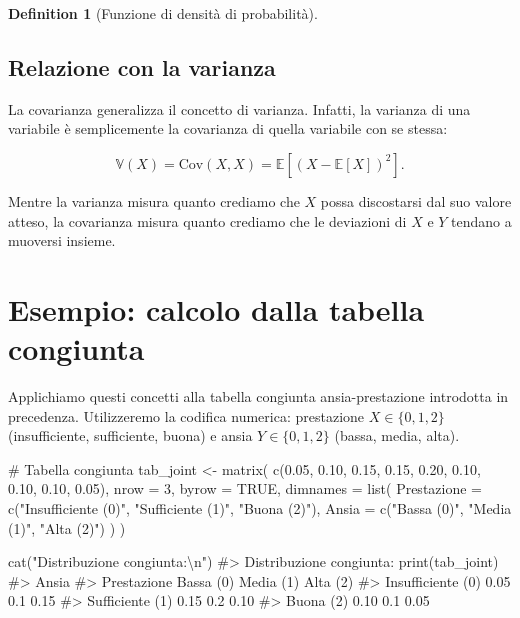 \documentclass[
  letterpaper,
  DIV=11,
  numbers=noendperiod,
  oneside]{scrreprt}
\newenvironment{Shaded}{\begin{snugshade}}{\end{snugshade}}
\newcommand{\AttributeTok}[1]{\textcolor[rgb]{0.40,0.45,0.13}{#1}}
\newcommand{\CommentTok}[1]{\textcolor[rgb]{0.37,0.37,0.37}{#1}}
\newcommand{\ConstantTok}[1]{\textcolor[rgb]{0.56,0.35,0.01}{#1}}
\newcommand{\DecValTok}[1]{\textcolor[rgb]{0.68,0.00,0.00}{#1}}
\newcommand{\FloatTok}[1]{\textcolor[rgb]{0.68,0.00,0.00}{#1}}
\newcommand{\FunctionTok}[1]{\textcolor[rgb]{0.28,0.35,0.67}{#1}}
\newcommand{\NormalTok}[1]{\textcolor[rgb]{0.00,0.23,0.31}{#1}}
\newcommand{\OtherTok}[1]{\textcolor[rgb]{0.00,0.23,0.31}{#1}}
\newcommand{\SpecialCharTok}[1]{\textcolor[rgb]{0.37,0.37,0.37}{#1}}
\newcommand{\StringTok}[1]{\textcolor[rgb]{0.13,0.47,0.30}{#1}}
\theoremstyle{definition}
\theoremstyle{plain}
\theoremstyle{definition}
\newtheorem{definition}{Definition}[chapter]
\theoremstyle{remark}
\begin{document}
\begin{definition}[Funzione di densità di
probabilità]
\subsection{Relazione con la varianza}\label{relazione-con-la-varianza}

La covarianza generalizza il concetto di varianza. Infatti, la varianza
di una variabile è semplicemente la covarianza di quella variabile con
se stessa:

\[
\mathbb{V}(X) = \text{Cov}(X, X) = \mathbb{E}[(X - \mathbb{E}[X])^2].
\]

Mentre la varianza misura quanto crediamo che \(X\) possa discostarsi
dal suo valore atteso, la covarianza misura quanto crediamo che le
deviazioni di \(X\) e \(Y\) tendano a muoversi insieme.

\section{Esempio: calcolo dalla tabella
congiunta}\label{esempio-calcolo-dalla-tabella-congiunta}

Applichiamo questi concetti alla tabella congiunta ansia-prestazione
introdotta in precedenza. Utilizzeremo la codifica numerica: prestazione
\(X \in \{0, 1, 2\}\) (insufficiente, sufficiente, buona) e ansia
\(Y \in \{0, 1, 2\}\) (bassa, media, alta).

\begin{Shaded}
\begin{Highlighting}[]
\CommentTok{\# Tabella congiunta}
\NormalTok{tab\_joint }\OtherTok{\textless{}{-}} \FunctionTok{matrix}\NormalTok{(}
  \FunctionTok{c}\NormalTok{(}\FloatTok{0.05}\NormalTok{, }\FloatTok{0.10}\NormalTok{, }\FloatTok{0.15}\NormalTok{,}
    \FloatTok{0.15}\NormalTok{, }\FloatTok{0.20}\NormalTok{, }\FloatTok{0.10}\NormalTok{,}
    \FloatTok{0.10}\NormalTok{, }\FloatTok{0.10}\NormalTok{, }\FloatTok{0.05}\NormalTok{),}
  \AttributeTok{nrow =} \DecValTok{3}\NormalTok{, }\AttributeTok{byrow =} \ConstantTok{TRUE}\NormalTok{,}
  \AttributeTok{dimnames =} \FunctionTok{list}\NormalTok{(}
    \AttributeTok{Prestazione =} \FunctionTok{c}\NormalTok{(}\StringTok{"Insufficiente (0)"}\NormalTok{, }\StringTok{"Sufficiente (1)"}\NormalTok{, }\StringTok{"Buona (2)"}\NormalTok{),}
    \AttributeTok{Ansia =} \FunctionTok{c}\NormalTok{(}\StringTok{"Bassa (0)"}\NormalTok{, }\StringTok{"Media (1)"}\NormalTok{, }\StringTok{"Alta (2)"}\NormalTok{)}
\NormalTok{  )}
\NormalTok{)}

\FunctionTok{cat}\NormalTok{(}\StringTok{"Distribuzione congiunta:}\SpecialCharTok{\textbackslash{}n}\StringTok{"}\NormalTok{)}
\CommentTok{\#\textgreater{} Distribuzione congiunta:}
\FunctionTok{print}\NormalTok{(tab\_joint)}
\CommentTok{\#\textgreater{}                    Ansia}
\CommentTok{\#\textgreater{} Prestazione         Bassa (0) Media (1) Alta (2)}
\CommentTok{\#\textgreater{}   Insufficiente (0)      0.05       0.1     0.15}
\CommentTok{\#\textgreater{}   Sufficiente (1)        0.15       0.2     0.10}
\CommentTok{\#\textgreater{}   Buona (2)              0.10       0.1     0.05}
\end{Highlighting}
\end{Shaded}


\end{definition}
\end{document}
